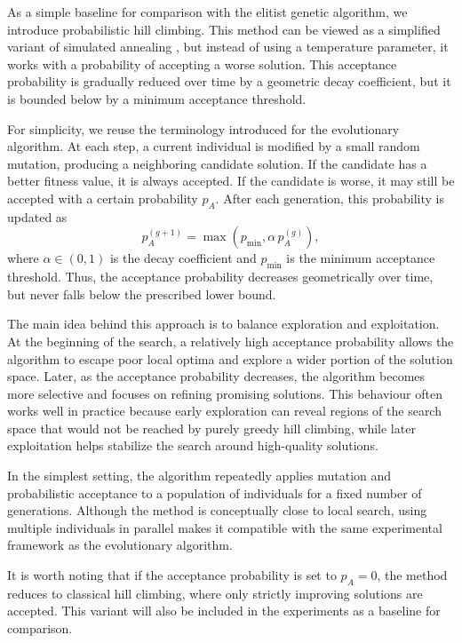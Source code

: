 As a simple baseline for comparison with the elitist genetic algorithm, we introduce probabilistic hill climbing. 
This method can be viewed as a simplified variant of simulated annealing \cite{eiben2016}, but instead of using a temperature parameter, it works with a probability of accepting a worse solution. 
This acceptance probability is gradually reduced over time by a geometric decay coefficient, but it is bounded below by a minimum acceptance threshold.

For simplicity, we reuse the terminology introduced for the evolutionary algorithm. 
At each step, a current individual is modified by a small random mutation, producing a neighboring candidate solution. 
If the candidate has a better fitness value, it is always accepted. 
If the candidate is worse, it may still be accepted with a certain probability $p_A$. 
After each generation, this probability is updated as
\[
p_A^{(g+1)} = \max(p_{\min}, \alpha \, p_A^{(g)}),
\]
where $\alpha \in (0,1)$ is the decay coefficient and $p_{\min}$ is the minimum acceptance threshold. 
Thus, the acceptance probability decreases geometrically over time, but never falls below the prescribed lower bound.

The main idea behind this approach is to balance exploration and exploitation. 
At the beginning of the search, a relatively high acceptance probability allows the algorithm to escape poor local optima and explore a wider portion of the solution space. 
Later, as the acceptance probability decreases, the algorithm becomes more selective and focuses on refining promising solutions. 
This behaviour often works well in practice because early exploration can reveal regions of the search space that would not be reached by purely greedy hill climbing, while later exploitation helps stabilize the search around high-quality solutions.

In the simplest setting, the algorithm repeatedly applies mutation and probabilistic acceptance to a population of individuals for a fixed number of generations. 
Although the method is conceptually close to local search, using multiple individuals in parallel makes it compatible with the same experimental framework as the evolutionary algorithm.

It is worth noting that if the acceptance probability is set to $p_A = 0$, the method reduces to classical hill climbing, where only strictly improving solutions are accepted. 
This variant will also be included in the experiments as a baseline for comparison.

